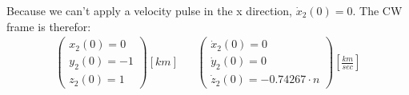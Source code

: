 \documentclass[11pt, a4paper]{article}
\begin{document}
Because we can't apply a velocity pulse in the x direction, $\dot{x}_2(0) = 0$. The CW frame is therefor:
\begin{equation}
    \begin{matrix}
    \begin{pmatrix}
        x_2(0)=0 \\ y_2(0)=-1 \\ z_2(0)=1
    \end{pmatrix}\left[km\right] &&
    \begin{pmatrix}
        \dot{x}_2(0)=0 \\ \dot{y}_2(0) =0 \\ \dot{z}_2(0)=-0.74267\cdot n
    \end{pmatrix}\left[\displaystyle\frac{km}{sec}\right]
    \end{matrix}
\end{equation}

\end{document}
